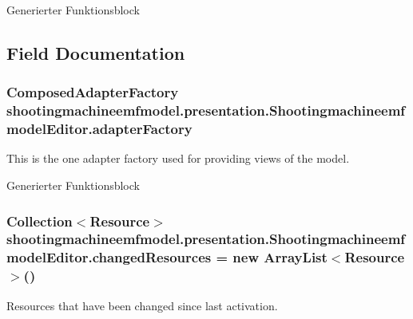 Generierter Funktionsblock 

\subsection{Field Documentation}
\hypertarget{classshootingmachineemfmodel_1_1presentation_1_1_shootingmachineemfmodel_editor_a9b082c3598baf8cd6ce6b4f8af3d1e0c}{
\subsubsection[{adapter\-Factory}]{\setlength{\rightskip}{0pt plus 5cm}Composed\-Adapter\-Factory shootingmachineemfmodel.\-presentation.\-Shootingmachineemfmodel\-Editor.\-adapter\-Factory\hspace{0.3cm}{\ttfamily [protected]}}}\label{classshootingmachineemfmodel_1_1presentation_1_1_shootingmachineemfmodel_editor_a9b082c3598baf8cd6ce6b4f8af3d1e0c}
This is the one adapter factory used for providing views of the model.

Generierter Funktionsblock \hypertarget{classshootingmachineemfmodel_1_1presentation_1_1_shootingmachineemfmodel_editor_adde575ef463fcb70a4c8c0d5db9ba280}{
\subsubsection[{changed\-Resources}]{\setlength{\rightskip}{0pt plus 5cm}Collection$<$Resource$>$ shootingmachineemfmodel.\-presentation.\-Shootingmachineemfmodel\-Editor.\-changed\-Resources = new Array\-List$<$Resource$>$()\hspace{0.3cm}{\ttfamily [protected]}}}\label{classshootingmachineemfmodel_1_1presentation_1_1_shootingmachineemfmodel_editor_adde575ef463fcb70a4c8c0d5db9ba280}
Resources that have been changed since last activation.

